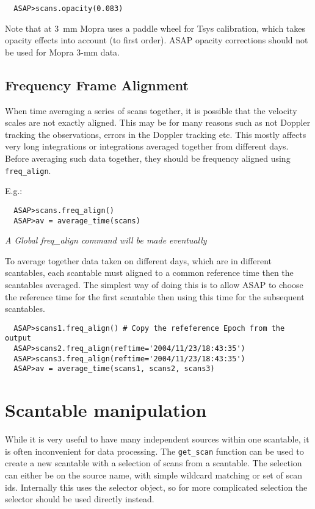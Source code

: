 \documentclass[11pt]{article}
\newcommand{\cmd}[1]{{\tt #1}}
\begin{document}
\begin{verbatim}
  ASAP>scans.opacity(0.083)
\end{verbatim}

Note that at 3~mm Mopra uses a paddle wheel for Tsys calibration,
which takes opacity effects into account (to first order). ASAP
opacity corrections should not be used for Mopra 3-mm data.

\subsection{Frequency Frame Alignment}
\label{sec:freqalign}

When time
averaging a series of scans together, it is possible that the velocity
scales are not exactly aligned.  This may be for many reasons such as
not Doppler tracking the observations, errors in the Doppler tracking
etc.  This mostly affects very long integrations or integrations
averaged together from different days.  Before averaging such data
together, they should be frequency aligned using \cmd{freq\_align}.

E.g.:

\begin{verbatim}
  ASAP>scans.freq_align()
  ASAP>av = average_time(scans)
\end{verbatim}

{\em A Global freq\_align command will be made eventually}

To average together data taken on different days, which are in
different scantables, each scantable must aligned to a common
reference time then the scantables averaged. The simplest way of
doing this is to allow ASAP to choose the reference time for the first
scantable then using this time for the subsequent scantables.

\begin{verbatim}
  ASAP>scans1.freq_align() # Copy the refeference Epoch from the output
  ASAP>scans2.freq_align(reftime='2004/11/23/18:43:35')
  ASAP>scans3.freq_align(reftime='2004/11/23/18:43:35')
  ASAP>av = average_time(scans1, scans2, scans3)
\end{verbatim}

\section{Scantable manipulation}

While it is very useful to have many
independent sources within one scantable, it is often inconvenient for
data processing. The \cmd{get\_scan} function can be used to create a
new scantable with a selection of scans from a scantable. The
selection can either be on the source name, with simple wildcard
matching or set of scan ids. Internally this uses the selector object,
so for more complicated selection the selector should be used directly
instead.
\end{document}

